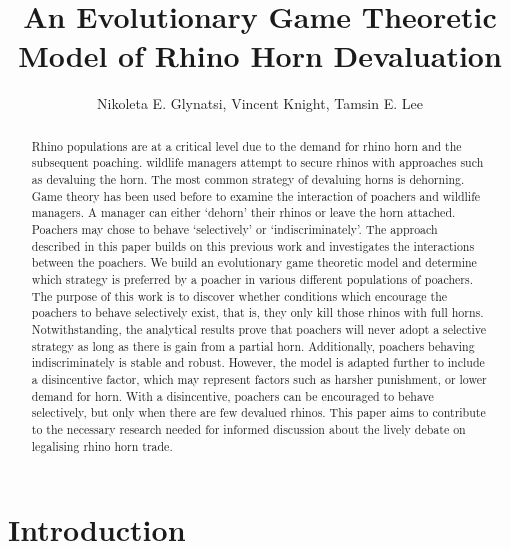 \documentclass[10pt]{article}
\title{An Evolutionary Game Theoretic Model of Rhino Horn Devaluation}
\author{Nikoleta E. Glynatsi, Vincent Knight, Tamsin E. Lee} %
\date{}
\begin{document}
\maketitle

\begin{abstract}

Rhino populations are at a critical level due to the demand for rhino horn and
the subsequent poaching. wildlife managers attempt to secure rhinos with
approaches such as devaluing the horn. The most common strategy of devaluing
horns is dehorning. Game theory has been used before to examine the interaction
of poachers and wildlife managers. A manager can either `dehorn' their rhinos or
leave the horn attached. Poachers may chose to behave `selectively' or
`indiscriminately'. The approach described in this paper builds on this previous
work and investigates the interactions between the poachers. We build an evolutionary
game theoretic model and determine which strategy is preferred by a poacher in various
different populations of poachers. The purpose of this work is to discover whether
conditions which encourage the poachers to behave selectively exist, that is,
they only kill those rhinos with full horns. Notwithstanding, the analytical
results prove that poachers will never adopt a selective strategy as long as
there is gain from a partial horn. Additionally, poachers behaving indiscriminately
is stable and robust. However, the model is adapted further to include a
disincentive factor, which may represent factors such as harsher punishment, or
lower demand for horn. With a disincentive, poachers can be encouraged to behave
selectively, but only when there are few devalued rhinos. This paper aims to
contribute to the necessary research needed for informed discussion about the
lively debate on legalising rhino horn trade.

\end{abstract}

\section{Introduction}\label{section:introduction}
\end{document}
